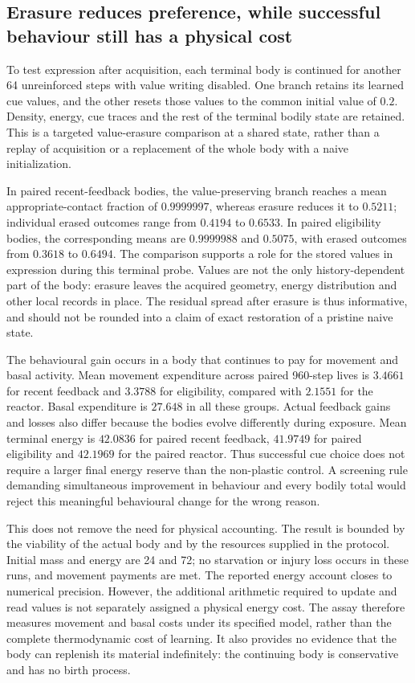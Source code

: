 

\subsection*{Erasure reduces preference, while successful behaviour still has a physical cost}

To test expression after acquisition, each terminal body is continued for another 64 unreinforced steps with value writing disabled. One branch retains its learned cue values, and the other resets those values to the common initial value of $0.2$. Density, energy, cue traces and the rest of the terminal bodily state are retained. This is a targeted value-erasure comparison at a shared state, rather than a replay of acquisition or a replacement of the whole body with a naive initialization.

In paired recent-feedback bodies, the value-preserving branch reaches a mean appropriate-contact fraction of $0.9999997$, whereas erasure reduces it to $0.5211$; individual erased outcomes range from $0.4194$ to $0.6533$. In paired eligibility bodies, the corresponding means are $0.9999988$ and $0.5075$, with erased outcomes from $0.3618$ to $0.6494$. The comparison supports a role for the stored values in expression during this terminal probe. Values are not the only history-dependent part of the body: erasure leaves the acquired geometry, energy distribution and other local records in place. The residual spread after erasure is thus informative, and should not be rounded into a claim of exact restoration of a pristine naive state.

The behavioural gain occurs in a body that continues to pay for movement and basal activity. Mean movement expenditure across paired 960-step lives is $3.4661$ for recent feedback and $3.3788$ for eligibility, compared with $2.1551$ for the reactor. Basal expenditure is $27.648$ in all these groups. Actual feedback gains and losses also differ because the bodies evolve differently during exposure. Mean terminal energy is $42.0836$ for paired recent feedback, $41.9749$ for paired eligibility and $42.1969$ for the paired reactor. Thus successful cue choice does not require a larger final energy reserve than the non-plastic control. A screening rule demanding simultaneous improvement in behaviour and every bodily total would reject this meaningful behavioural change for the wrong reason.

This does not remove the need for physical accounting. The result is bounded by the viability of the actual body and by the resources supplied in the protocol. Initial mass and energy are 24 and 72; no starvation or injury loss occurs in these runs, and movement payments are met. The reported energy account closes to numerical precision. However, the additional arithmetic required to update and read values is not separately assigned a physical energy cost. The assay therefore measures movement and basal costs under its specified model, rather than the complete thermodynamic cost of learning. It also provides no evidence that the body can replenish its material indefinitely: the continuing body is conservative and has no birth process.

